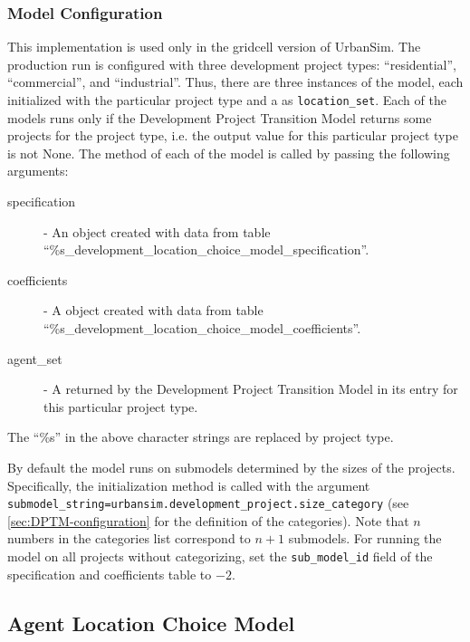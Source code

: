 \subsubsection{Model Configuration}
%
This implementation is used only in the gridcell version of UrbanSim.
The production run is configured with three development project
types: ``residential'', ``commercial'', and ``industrial''. Thus, there are
three instances of the model, each initialized with the particular project
type and a  as \verb|location_set|.  Each of the models 
runs only if the Development Project Transition Model returns some projects
for the project type, i.e. the output value for this particular project type
is not None.  The  method of each of the model is called by
passing the following arguments:
\begin{description}
\item[specification] - An
 object created with data from table
``\%s_development_location_choice_model_specification''. 
\item[coefficients] - A  object created
with data from table ``\%s_development_location_choice_model_coefficients''. 
\item[agent_set] - A  returned by the Development
  Project Transition Model in its entry for this particular project type.
\end{description}
The ``\%s'' in the above character strings are replaced by project type.

By default the model runs on submodels determined by the sizes of the projects. Specifically,
the initialization method is called with the argument \verb|submodel_string=urbansim.development_project.size_category|
(see \ref{sec:DPTM-configuration} for the definition of the categories). Note that $n$ numbers in
the categories list correspond to $n+1$ submodels. For running the model on all projects without categorizing, 
set the \verb|sub_model_id| field of the specification and coefficients table to $-2$.

%
%
\subsection{Agent Location Choice Model}
%
\label{sec:agent-lcm}

